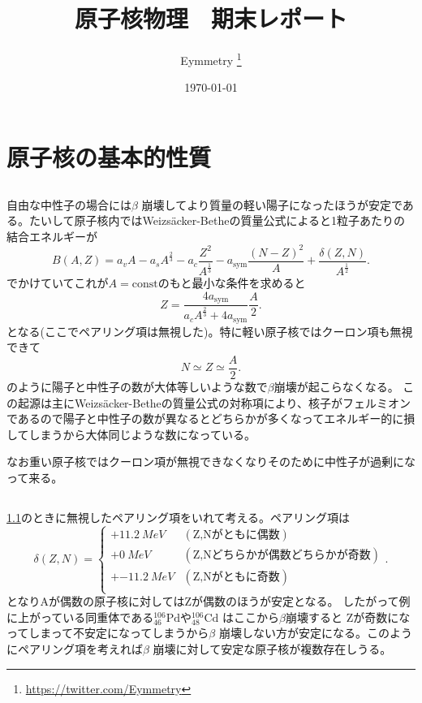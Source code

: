 \documentclass[dvipdfmx]{jsarticle}
\title{原子核物理　期末レポート}
\author{Eymmetry \thanks{\url{https://twitter.com/Eymmetry}}}
\date{\today}
\begin{document}
\maketitle
\tableofcontents
\section{原子核の基本的性質}
\subsection{}\label{1-1}
自由な中性子の場合には$\beta$ 崩壊してより質量の軽い陽子になったほうが安定である。たいして原子核内ではWeizs\"{a}cker-Betheの質量公式によると1粒子あたりの結合エネルギーが
\begin{equation}
\label{eq:wi}
B(A,Z)=a_vA-a_sA^{\frac{2}{3}}-a_c \frac{Z^2}{A^{\frac{1}{3}}}-a_\text{sym} \frac{(N-Z)^2}{A}+\frac{\delta(Z,N)}{A^{\frac{1}{2}}}
.\end{equation}
でかけていてこれが$A=\mathrm{const}$のもと最小な条件を求めると
\[
Z=\frac{4a_\text{sym} }{a_c A^{\frac{2}{3}}+4a_\text{sym} }\frac{A}{2}
.\] 
となる(ここでペアリング項は無視した)。特に軽い原子核ではクーロン項も無視できて
\[
N\simeq Z\simeq  \frac{A}{2}
.\] 
のように陽子と中性子の数が大体等しいような数で$\beta$崩壊が起こらなくなる。
この起源は主にWeizs\"{a}cker-Betheの質量公式の対称項により、核子がフェルミオンであるので陽子と中性子の数が異なるとどちらかが多くなってエネルギー的に損してしまうから大体同じような数になっている。

なお重い原子核ではクーロン項が無視できなくなりそのために中性子が過剰になって来る。\\
\subsection{}\label{1-2}
\ref{1-1}のときに無視したペアリング項をいれて考える。ペアリング項は
\[
\delta(Z,N)=\begin{cases}
	+\SI{11.2}{MeV}& (\text{Z,Nがともに偶数})\\
	+\SI{0}{MeV}& (\text{Z,Nどちらかが偶数どちらかが奇数})\\
	+\SI{-11.2}{MeV}& (\text{Z,Nがともに奇数})\\
\end{cases}
.\] 
となりAが偶数の原子核に対してはZが偶数のほうが安定となる。
したがって例に上がっている同重体である$\mathrm{^{106}_{46}Pd}$や$\mathrm{^{106}_{48}Cd}$ はここから$\beta$崩壊すると Zが奇数になってしまって不安定になってしまうから$\beta$ 崩壊しない方が安定になる。このようにペアリング項を考えれば$\beta$ 崩壊に対して安定な原子核が複数存在しうる。\\
\end{document}
